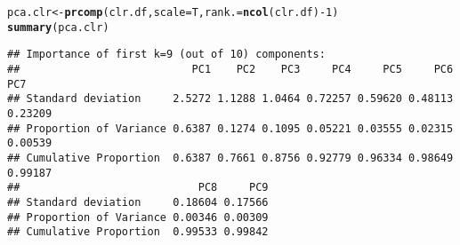 \documentclass[a4paper,oneside,12pt,titlepage]{article}\usepackage[]{graphicx}\usepackage[]{color}
\makeatletter
\newcommand{\hlnum}[1]{\textcolor[rgb]{0.686,0.059,0.569}{#1}}%
\newcommand{\hlopt}[1]{\textcolor[rgb]{0,0,0}{#1}}%
\newcommand{\hlstd}[1]{\textcolor[rgb]{0.345,0.345,0.345}{#1}}%
\newcommand{\hlkwb}[1]{\textcolor[rgb]{0.69,0.353,0.396}{#1}}%
\newcommand{\hlkwc}[1]{\textcolor[rgb]{0.333,0.667,0.333}{#1}}%
\newcommand{\hlkwd}[1]{\textcolor[rgb]{0.737,0.353,0.396}{\textbf{#1}}}%
\newenvironment{kframe}{%
 \def\at@end@of@kframe{}%
 \ifinner\ifhmode%
  \def\at@end@of@kframe{\end{minipage}}%
  \begin{minipage}{\columnwidth}%
 \fi\fi%
 \def\FrameCommand##1{\hskip\@totalleftmargin \hskip-\fboxsep
 \colorbox{shadecolor}{##1}\hskip-\fboxsep
     \hskip-\linewidth \hskip-\@totalleftmargin \hskip\columnwidth}%
 \MakeFramed {\advance\hsize-\width
   \@totalleftmargin\z@ \linewidth\hsize
   \@setminipage}}%
 {\par\unskip\endMakeFramed%
 \at@end@of@kframe}
\newenvironment{knitrout}{}{} %
\makeatother
\begin{document}
\begin{knitrout}
\color{fgcolor}\begin{kframe}
\begin{alltt}
\hlstd{pca.clr} \hlkwb{<-} \hlkwd{prcomp}\hlstd{(clr.df,}\hlkwc{scale} \hlstd{= T,}\hlkwc{rank.} \hlstd{=} \hlkwd{ncol}\hlstd{(clr.df)}\hlopt{-}\hlnum{1} \hlstd{)}
\hlkwd{summary}\hlstd{(pca.clr)}
\end{alltt}
\begin{verbatim}
## Importance of first k=9 (out of 10) components:
##                           PC1    PC2    PC3     PC4     PC5     PC6     PC7
## Standard deviation     2.5272 1.1288 1.0464 0.72257 0.59620 0.48113 0.23209
## Proportion of Variance 0.6387 0.1274 0.1095 0.05221 0.03555 0.02315 0.00539
## Cumulative Proportion  0.6387 0.7661 0.8756 0.92779 0.96334 0.98649 0.99187
##                            PC8     PC9
## Standard deviation     0.18604 0.17566
## Proportion of Variance 0.00346 0.00309
## Cumulative Proportion  0.99533 0.99842
\end{verbatim}
\end{kframe}
\end{knitrout}
\end{document}
